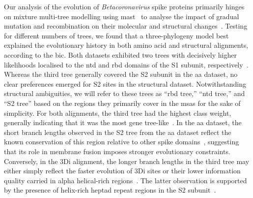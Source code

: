 Our analysis of the evolution of \textit{Betacoronavirus} spike proteins primarily hinges on mixture multi-tree modelling using \gls{mast}~\cite{wong2024} to analyse the impact of gradual mutation and recombination on their molecular and structural changes~\cite{scheidwasser2025a}. Testing for different numbers of trees, we found that a three-phylogeny model best explained the evolutionary history in both amino acid and structural alignments, according to the \gls{bic}. Both datasets exhibited two trees with decisively higher likelihoods localised to the \gls{ntd} and \gls{rbd} domains of the S1 subunit, respectively~\cite{scheidwasser2025a}. Whereas the third tree generally covered the S2 subunit in the \gls{aa} dataset, no clear preferences emerged for S2 sites in the structural dataset. Notwithstanding structural ambiguities, we will refer to these trees as “\gls{rbd} tree,” “\gls{ntd} tree,” and “S2 tree” based on the regions they primarily cover in the \glspl{msa} for the sake of simplicity. For both alignments, the third tree had the highest class weight, generally indicating that it was the most gene tree-like~\cite{wong2024}. In the \gls{aa} dataset, the short branch lengths observed in the S2 tree from the \gls{aa} dataset reflect the known conservation of this region relative to other spike domains~\cite{degroot1987, bosch2003, deklerk2022}, suggesting that its role in membrane fusion imposes stronger evolutionary constraints. Conversely, in the 3Di alignment, the longer branch lengths in the third tree may either simply reflect the faster evolution of 3Di sites or their lower information quality carried in alpha helical-rich regions~\cite{fullmer2025}. The latter observation is supported by the presence of helix-rich heptad repeat regions in the S2 subunit~\cite{guo2023}.

